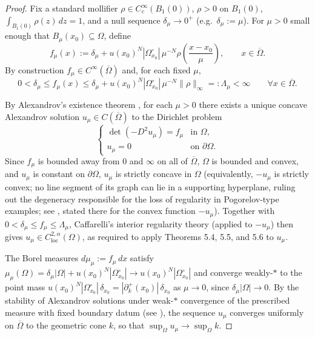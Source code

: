 \documentclass[10pt,a4paper]{amsart}
\numberwithin{equation}{section}
\begin{document}
\begin{proof}
Fix a standard mollifier $\rho \in C_c^\infty(B_1(0))$, $\rho>0$ on $B_1(0)$, $\int_{B_1(0)} \rho(z)\,dz = 1$, and a null sequence $\delta_\mu \to 0^+$ (e.g.\ $\delta_\mu:=\mu$). For $\mu>0$ small enough that $B_\mu(x_0)\subseteq\Omega$, define
\[
f_\mu(x) := \delta_\mu + u(x_0)^N |\Omega^\circ_{x_0}| \, \mu^{-N} \rho\left(\frac{x-x_0}{\mu}\right), \qquad x \in \overline\Omega.
\]
By construction $f_\mu \in C^\infty(\overline\Omega)$ and, for each fixed $\mu$,
\[
0 < \delta_\mu \le f_\mu(x) \le \delta_\mu + u(x_0)^N|\Omega^\circ_{x_0}|\,\mu^{-N}\|\rho\|_\infty =: \Lambda_\mu < \infty \qquad \forall x \in \overline\Omega.
\]

\noindent By Alexandrov's existence theorem \cite{gutierrez2016, figalli2017}, for each $\mu > 0$ there exists a unique concave Alexandrov solution $u_\mu \in C(\overline\Omega)$ to the Dirichlet problem
\[
\begin{cases}
\det(-D^2 u_\mu) = f_\mu & \text{in } \Omega, \\
u_\mu = 0 & \text{on } \partial\Omega.
\end{cases}
\]
Since $f_\mu$ is bounded away from $0$ and $\infty$ on all of $\overline\Omega$, $\Omega$ is bounded and convex, and $u_\mu$ is constant on $\partial\Omega$, $u_\mu$ is strictly concave in $\Omega$ (equivalently, $-u_\mu$ is strictly convex; no line segment of its graph can lie in a supporting hyperplane, ruling out the degeneracy responsible for the loss of regularity in Pogorelov-type examples; see \cite{caffarelli1990localization}, stated there for the convex function $-u_\mu$). Together with $0<\delta_\mu\le f_\mu\le\Lambda_\mu$, Caffarelli's interior regularity theory \cite{caffarelli1990interior, caffarelli1990localization, caffarelli1991regularity} (applied to $-u_\mu$) then gives $u_\mu \in C^{2,\alpha}_{\mathrm{loc}}(\Omega)$, as required to apply Theorems 5.4, 5.5, and 5.6 to $u_\mu$.

\noindent The Borel measures $d\mu_\mu := f_\mu \, dx$ satisfy $\mu_\mu(\Omega) = \delta_\mu|\Omega| + u(x_0)^N|\Omega^\circ_{x_0}| \to u(x_0)^N|\Omega^\circ_{x_0}|$ and converge weakly-$*$ to the point mass $u(x_0)^N|\Omega^\circ_{x_0}|\,\delta_{x_0} = |\partial^+_k(x_0)|\,\delta_{x_0}$ as $\mu \to 0$, since $\delta_\mu|\Omega|\to0$. By the stability of Alexandrov solutions under weak-$*$ convergence of the prescribed measure with fixed boundary datum (see \cite{gutierrez2016, figalli2017}), the sequence $u_\mu$ converges uniformly on $\overline\Omega$ to the geometric cone $k$, so that $\sup_\Omega u_\mu \to \sup_\Omega k$.


\end{proof}
\end{document}
